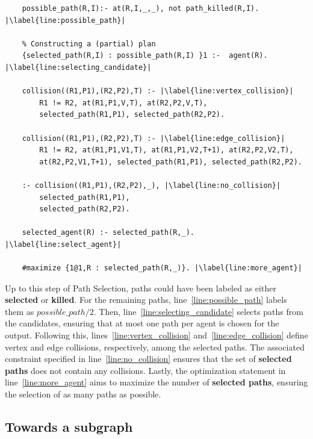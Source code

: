 \begin{minipage}[H]{\linewidth}
\begin{lstlisting}[style=mystyle, caption={Building a conflict free \(\tau'\)}, label={lst:ps_encoding}]
    % Defining collision & possible_path
    possible_path(R,I):- at(R,I,_,_), not path_killed(R,I). |\label{line:possible_path}|
    
    % Constructing a (partial) plan
    {selected_path(R,I) : possible_path(R,I) }1 :-  agent(R). |\label{line:selecting_candidate}|

    collision((R1,P1),(R2,P2),T) :- |\label{line:vertex_collision}|
        R1 != R2, at(R1,P1,V,T), at(R2,P2,V,T),
        selected_path(R1,P1), selected_path(R2,P2).

    collision((R1,P1),(R2,P2),T) :- |\label{line:edge_collision}|
        R1 != R2, at(R1,P1,V1,T), at(R1,P1,V2,T+1), at(R2,P2,V2,T), 
        at(R2,P2,V1,T+1), selected_path(R1,P1), selected_path(R2,P2).
    
    :- collision((R1,P1),(R2,P2),_), |\label{line:no_collision}|
        selected_path(R1,P1), 
        selected_path(R2,P2).

    selected_agent(R) :- selected_path(R,_).  |\label{line:select_agent}|    

    #maximize {1@1,R : selected_path(R,_)}. |\label{line:more_agent}|
\end{lstlisting}
\end{minipage}

Up to this step of Path Selection, paths could have been labeled as either \textbf{selected} or \textbf{killed}. For the remaining paths, line~\ref{line:possible_path} labels them as \(possible\_path/2\). Then, line~\ref{line:selecting_candidate} selects paths from the candidates, ensuring that at most one path per agent is chosen for the output. Following this, lines~\ref{line:vertex_collision} and~\ref{line:edge_collision} define vertex and edge collisions, respectively, among the selected paths. The associated constraint specified in line~\ref{line:no_collision} ensures that the set of \textbf{selected paths} does not contain any collisions. Lastly, the optimization statement in line~\ref{line:more_agent} aims to maximize the number of \textbf{selected paths}, ensuring the selection of as many paths as possible.


\subsection{Towards a subgraph}


